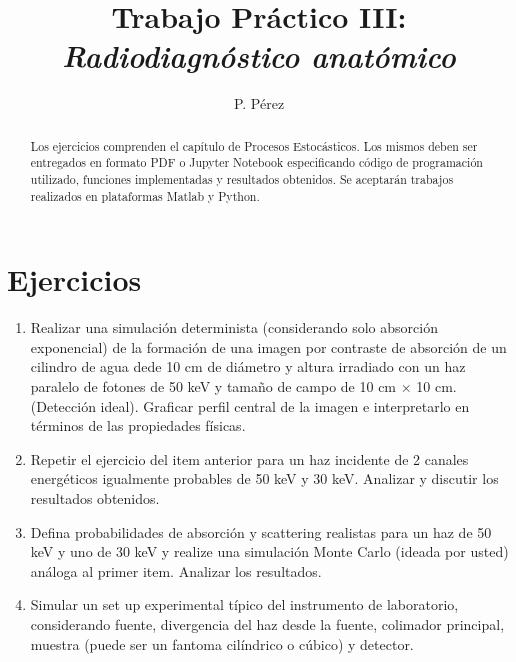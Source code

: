 \documentclass[a4paper,10pt]{article}
\title{{\bf Trabajo Práctico III:}\\ \emph{Radiodiagnóstico anatómico}}
\author{P. Pérez}
\begin{document}
\maketitle

\begin{abstract}
Los ejercicios comprenden el capítulo de Procesos Estocásticos. Los mismos deben ser entregados en formato PDF o Jupyter Notebook especificando código de programación utilizado, funciones implementadas y resultados obtenidos. Se aceptarán trabajos realizados en plataformas Matlab y Python.
\end{abstract}

\section*{Ejercicios}

\begin{enumerate}
 \item  Realizar una simulación determinista (considerando solo absorción exponencial) de la formación de una imagen por contraste de absorción de un cilindro de agua dede 10 cm de diámetro y altura irradiado con un haz paralelo de fotones de 50 keV y tamaño de campo de 10 cm $\times$ 10 cm. (Detección ideal). Graficar perfil central de la imagen e interpretarlo en términos de las propiedades físicas.
 \item Repetir el ejercicio del item anterior para un haz incidente de 2 canales energéticos igualmente probables de 50 keV y 30 keV. Analizar y discutir los resultados obtenidos.
 \item Defina probabilidades de absorción y scattering realistas para un haz de 50 keV y uno de 30 keV y realize una simulación Monte Carlo (ideada por usted) análoga al primer item. Analizar los resultados.
 \item Simular un set up experimental típico del instrumento de laboratorio, considerando fuente, divergencia del haz desde la fuente, colimador principal, muestra (puede ser un fantoma cilíndrico o cúbico) y detector.
 \end{enumerate}
\end{document}
